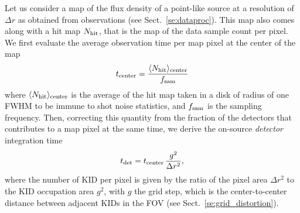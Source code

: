 Let us consider a map of the flux density of a point-like source at a
resolution of $\Delta r$ as obtained from observations (see
Sect.~\ref{se:dataproc}).
This map also comes along with a hit map $N_{\rm{hit}}$, that is the
map of the data sample count per pixel. We first evaluate the
average observation time per map pixel at the center of the map
%
%
\begin{equation}
t_{\rm{center}} = \frac{\langle N_{\rm{hit}}\rangle_{\rm{center}}}{f_{\rm{sam}}} 
\end{equation}
where $\langle N_{\rm{hit}}\rangle_{\rm{center}}$ is the average of
the hit map taken in a disk of radius of one FWHM to be immune to shot
noise statistics, and $f_{\rm{sam}}$ is the sampling frequency. 
Then, correcting this quantity from the fraction of the detectors that
contributes to a map pixel at the same time, we derive the on-source
\emph{detector} integration time
%
\begin{equation}
  t_{\rm{det}} = t_{\rm{center}}\, \frac{g^2}{\Delta r^2},
\label{eq:t_det}
\end{equation}
%
where the number of KID per pixel is given by the ratio of the
pixel area $\Delta r^2$ to the KID occupation area $g^2$, with $g$
the grid step, which is the center-to-center distance between adjacent
KIDs in the FOV (see Sect.~\ref{se:grid_distortion}).

%
%

